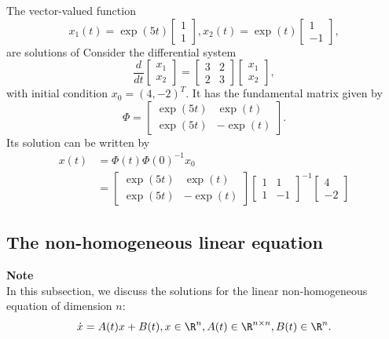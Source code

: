 \begin{refsection}
\begin{example}
	The vector-valued function
	$$x_1(t) = \exp(5t)\begin{bmatrix}
	1\\
	1
	\end{bmatrix},x_2(t) = \exp(t)\begin{bmatrix}
	1\\
	-1
	\end{bmatrix},$$
	are solutions of 
Consider the differential system
	$$\frac{d}{dt}\begin{bmatrix}
	x_1\\
	x_2
	\end{bmatrix} = \begin{bmatrix}
	3 & 2\\
	2 & 3
	\end{bmatrix}\begin{bmatrix}
	x_1\\
	x_2
	\end{bmatrix},$$
	with initial condition $x_0 = (4,-2)^T.$
	It has the fundamental matrix given by
	$$\Phi = \begin{bmatrix}
	\exp(5t) & \exp(t) \\
	\exp(5t) & -\exp(t) 
	\end{bmatrix}.$$
Its solution can be written by
\begin{align*}
x(t) &= \Phi(t)\Phi(0)^{-1}x_0 \\
&= \begin{bmatrix}
\exp(5t) & \exp(t) \\
\exp(5t) & -\exp(t) 
\end{bmatrix}\begin{bmatrix}
1 & 1 \\
1 & -1 
\end{bmatrix}^{-1}\begin{bmatrix}
4\\
-2
\end{bmatrix}
\end{align*}
\end{example}



\subsection{The non-homogeneous linear equation}
\begin{mdframed}
\textbf{Note}\\
In this subsection, we discuss the solutions for the linear non-homogeneous equation of dimension $n$:
$$\dot{x} = A(t)x + B(t), x\in \R^n, A(t)\in \R^{n\times n},B(t) \in \R^n.$$
\end{mdframed}



\end{refsection}
